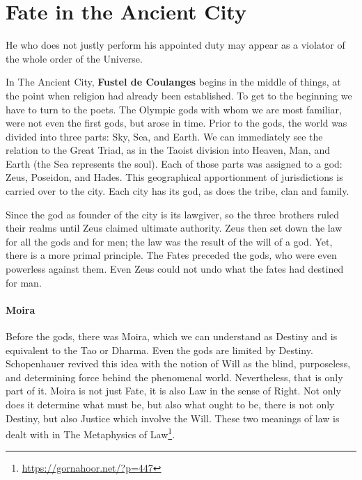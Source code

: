 \section{Fate in the Ancient City}

\begin{quotex}
He who does not justly perform his appointed duty may appear as a violator of the whole order of the Universe.
\end{quotex}


In The Ancient City, \textbf{Fustel de Coulanges} begins in the middle of things, at the point when religion had already been established. To get to the beginning we have to turn to the poets. The Olympic gods with whom we are most familiar, were not even the first gods, but arose in time. Prior to the gods, the world was divided into three parts: Sky, Sea, and Earth. We can immediately see the relation to the Great Triad, as in the Taoist division into Heaven, Man, and Earth (the Sea represents the soul). Each of those parts was assigned to a god: Zeus, Poseidon, and Hades. This geographical apportionment of jurisdictions is carried over to the city. Each city has its god, as does the tribe, clan and family.

Since the god as founder of the city is its lawgiver, so the three brothers ruled their realms until Zeus claimed ultimate authority. Zeus then set down the law for all the gods and for men; the law was the result of the will of a god. Yet, there is a more primal principle. The Fates preceded the gods, who were even powerless against them. Even Zeus could not undo what the fates had destined for man.

\paragraph{Moira}


Before the gods, there was Moira, which we can understand as Destiny and is equivalent to the Tao or Dharma. Even the gods are limited by Destiny. Schopenhauer revived this idea with the notion of Will as the blind, purposeless, and determining force behind the phenomenal world. Nevertheless, that is only part of it. Moira is not just Fate, it is also Law in the sense of Right. Not only does it determine what must be, but also what ought to be, there is not only Destiny, but also Justice which involve the Will. These two meanings of law is dealt with in The Metaphysics of Law\footnote{\url{https://gornahoor.net/?p=447}}.

